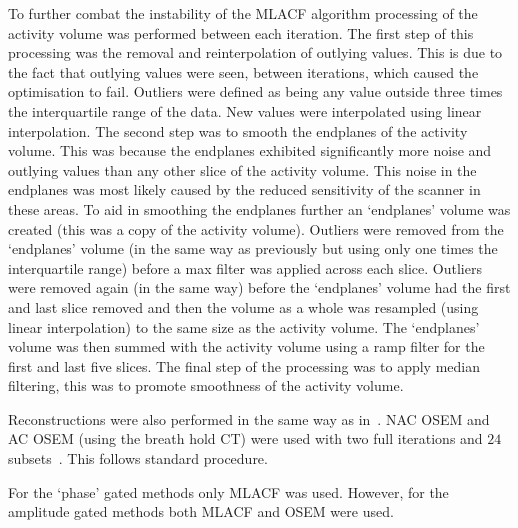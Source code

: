                 To further combat the instability of the \gls{MLACF} algorithm processing of the activity volume was performed between each iteration. The first step of this processing was the removal and reinterpolation of outlying values. This is due to the fact that outlying values were seen, between iterations, which caused the optimisation to fail. Outliers were defined as being any value outside three times the interquartile range of the data. New values were interpolated using linear interpolation. The second step was to smooth the endplanes of the activity volume. This was because the endplanes exhibited significantly more noise and outlying values than any other slice of the activity volume. This noise in the endplanes was most likely caused by the reduced sensitivity of the scanner in these areas. To aid in smoothing the endplanes further an `endplanes' volume was created (this was a copy of the activity volume). Outliers were removed from the `endplanes' volume (in the same way as previously but using only one times the interquartile range) before a max filter was applied across each slice. Outliers were removed again (in the same way) before the `endplanes' volume had the first and last slice removed and then the volume as a whole was resampled (using linear interpolation) to the same size as the activity volume. The `endplanes' volume was then summed with the activity volume using a ramp filter for the first and last five slices. The final step of the processing was to apply median filtering, this was to promote smoothness of the activity volume.

                Reconstructions were also performed in the same way as in~. \gls{NAC} \gls{OSEM} and \gls{AC} \gls{OSEM} (using the breath hold \gls{CT}) were used with two full iterations and $24$ subsets~\parencite{Hudson1994}. This follows standard procedure.
                
                For the `phase' gated methods only \gls{MLACF} was used. However, for the amplitude gated methods both \gls{MLACF} and \gls{OSEM} were used.
            
